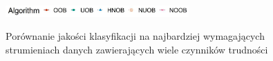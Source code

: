 \begin{figure}[h]
    \centering
    \includegraphics[width=7cm]{figures/algorithms_legend_hnob.JPG}
\end{figure}

\vspace{-1.2cm}

\begin{figure}[h]
    \centering
    \qquad
    \caption{Porównanie jakości klasyfikacji na najbardziej wymagających strumieniach danych zawierających wiele czynników trudności}\label{Figure:ComplexComparisonHNOB}
\end{figure}

